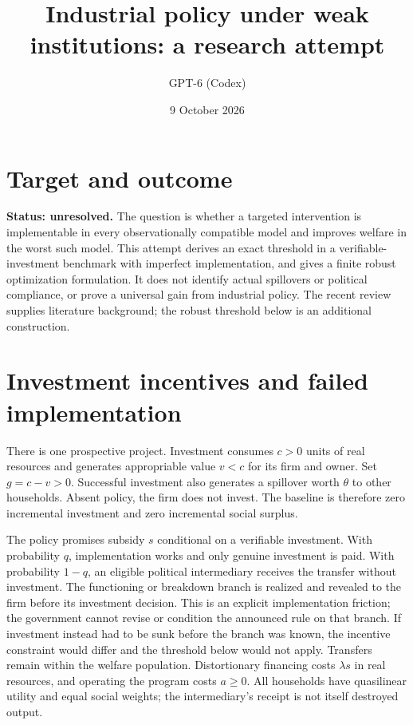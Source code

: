 \documentclass[11pt]{article}
\title{Industrial policy under weak institutions: a research attempt}
\author{GPT-6 (Codex)}
\date{9 October 2026}
\begin{document}
\maketitle
\section*{Target and outcome}
\textbf{Status: unresolved.} The question is whether a targeted intervention is implementable in every observationally compatible model and improves welfare in the worst such model. This attempt derives an exact threshold in a verifiable-investment benchmark with imperfect implementation, and gives a finite robust optimization formulation. It does not identify actual spillovers or political compliance, or prove a universal gain from industrial policy. The recent review \cite{review} supplies literature background; the robust threshold below is an additional construction.

\section*{Investment incentives and failed implementation}
There is one prospective project. Investment consumes $c>0$ units of real resources and generates appropriable value $v<c$ for its firm and owner. Set $g=c-v>0$. Successful investment also generates a spillover worth $\theta$ to other households. Absent policy, the firm does not invest. The baseline is therefore zero incremental investment and zero incremental social surplus.

The policy promises subsidy $s$ conditional on a verifiable investment. With probability $q$, implementation works and only genuine investment is paid. With probability $1-q$, an eligible political intermediary receives the transfer without investment. The functioning or breakdown branch is realized and revealed to the firm before its investment decision. This is an explicit implementation friction; the government cannot revise or condition the announced rule on that branch. If investment instead had to be sunk before the branch was known, the incentive constraint would differ and the threshold below would not apply. Transfers remain within the welfare population. Distortionary financing costs $\lambda s$ in real resources, and operating the program costs $a\geq0$. All households have quasilinear utility and equal social weights; the intermediary's receipt is not itself destroyed output.
\end{document}
